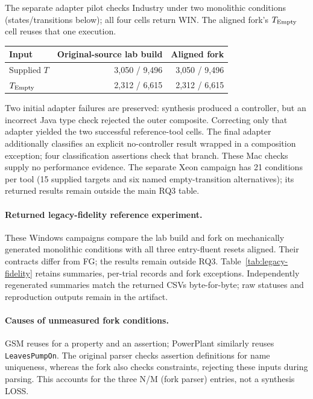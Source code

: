\documentclass[11pt]{article}
\begin{document}
The separate adapter pilot checks Industry under two monolithic conditions (states/transitions below); all four cells return WIN. The aligned fork's $T_{\rm Empty}$ cell reuses that one execution.
\begin{center}\small
\begin{tabular}{@{}lrr@{}}\toprule
Input & Original-source lab build & Aligned fork\\\midrule
Supplied $T$ & 3,050 / 9,496 & 3,050 / 9,496\\
$T_{\rm Empty}$ & 2,312 / 6,615 & 2,312 / 6,615\\\bottomrule
\end{tabular}\end{center}
Two initial adapter failures are preserved: synthesis produced a controller, but an incorrect Java type check rejected the outer composite. Correcting only that adapter yielded the two successful reference-tool cells. The final adapter additionally classifies an explicit no-controller result wrapped in a composition exception; four classification assertions check that branch. These Mac checks supply no performance evidence. The separate Xeon campaign has 21 conditions per tool (15 supplied targets and six named empty-transition alternatives); its returned results remain outside the main RQ3 table.

\paragraph{Returned legacy-fidelity reference experiment.}
These Windows campaigns compare the lab build and fork on mechanically generated monolithic conditions with all three entry-fluent resets aligned. Their contracts differ from FG; the results remain outside RQ3. Table~\ref{tab:legacy-fidelity} retains summaries, per-trial records and fork exceptions. Independently regenerated summaries match the returned CSVs byte-for-byte; raw statuses and reproduction outputs remain in the artifact.



\paragraph{Causes of unmeasured fork conditions.}
GSM reuses  for a property and an assertion; PowerPlant similarly reuses \texttt{LeavesPumpOn}. The original parser checks assertion definitions for name uniqueness, whereas the fork also checks constraints, rejecting these inputs during parsing. This accounts for the three N/M (fork parser) entries, not a synthesis LOSS.
\end{document}

